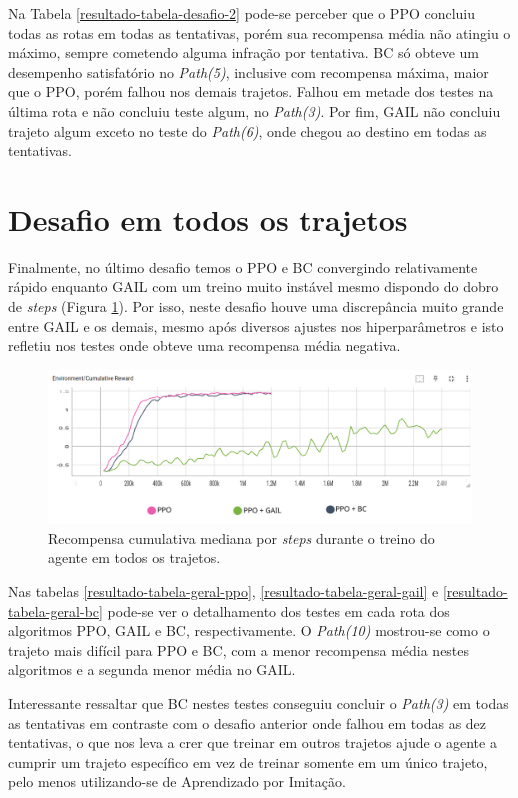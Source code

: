 Na Tabela \ref{resultado-tabela-desafio-2} pode-se perceber que o PPO concluiu todas as rotas em todas as tentativas, porém sua recompensa média não atingiu o máximo, sempre cometendo alguma infração por tentativa. BC só obteve um desempenho satisfatório no \textit{Path(5)}, inclusive com recompensa máxima, maior que o PPO, porém falhou nos demais trajetos. Falhou em metade dos testes na última rota e não concluiu teste algum, no \textit{Path(3)}. Por fim, GAIL não concluiu trajeto algum exceto no teste do \textit{Path(6)}, onde chegou ao destino em todas as tentativas.

\section{Desafio em todos os trajetos}
Finalmente, no último desafio temos o PPO e BC convergindo relativamente rápido enquanto GAIL com um treino muito instável mesmo dispondo do dobro de \textit{steps} (Figura \ref{fig:result-desafio-geral}). Por isso, neste desafio houve uma discrepância muito grande entre GAIL e os demais, mesmo após diversos ajustes nos hiperparâmetros e isto refletiu nos testes onde obteve uma recompensa média negativa.

\begin{figure}[h]
    \centering
    \includegraphics[scale=0.35]{figs/treinos/desafio-geral/recompensa-ppo-gail-bc.png}
    \caption{Recompensa cumulativa mediana por \textit{steps} durante o treino do agente em todos os trajetos.}
    \label{fig:result-desafio-geral}
\end{figure}

Nas tabelas \ref{resultado-tabela-geral-ppo}, \ref{resultado-tabela-geral-gail} e \ref{resultado-tabela-geral-bc} pode-se ver o detalhamento dos testes em cada rota dos algoritmos PPO, GAIL e BC, respectivamente. O \textit{Path(10)} mostrou-se como o trajeto mais difícil para PPO e BC, com a menor recompensa média nestes algoritmos e a segunda menor média no GAIL.

Interessante ressaltar que BC nestes testes conseguiu concluir o \textit{Path(3)} em todas as tentativas em contraste com o desafio anterior onde falhou em todas as dez tentativas, o que nos leva a crer que treinar em outros trajetos ajude o agente a cumprir um trajeto específico em vez de treinar somente em um único trajeto, pelo menos utilizando-se de Aprendizado por Imitação.

